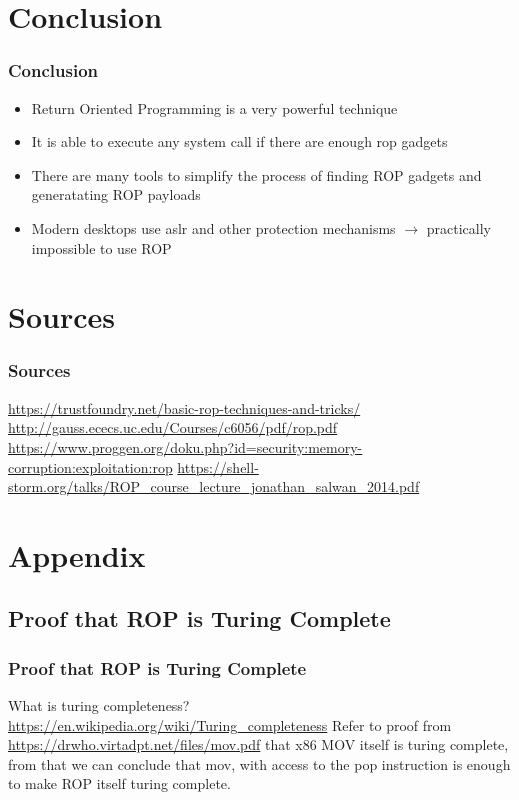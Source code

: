 \documentclass[11pt]{beamer}
\begin{document}
\section{Conclusion}
\begin{frame}
    \frametitle{Conclusion}
    \begin{itemize}
        \item Return Oriented Programming is a very powerful technique
        \item It is able to execute any system call if there are enough rop gadgets
        \item There are many tools to simplify the process of finding ROP gadgets and generatating ROP payloads
        \item Modern desktops use aslr and other protection mechanisms $\rightarrow$ practically impossible to use ROP
    \end{itemize}
\end{frame}

\section*{Sources}
\begin{frame}
    \frametitle{Sources}
    \url{https://trustfoundry.net/basic-rop-techniques-and-tricks/}
    \url{http://gauss.ececs.uc.edu/Courses/c6056/pdf/rop.pdf}
    \url{https://www.proggen.org/doku.php?id=security:memory-corruption:exploitation:rop}
    \url{https://shell-storm.org/talks/ROP_course_lecture_jonathan_salwan_2014.pdf}
\end{frame}

\section*{Appendix}
\subsection*{Proof that ROP is Turing Complete}
\begin{frame}
    \frametitle{Proof that ROP is Turing Complete}
    What is turing completeness? \url{https://en.wikipedia.org/wiki/Turing_completeness}
    Refer to proof from \url{https://drwho.virtadpt.net/files/mov.pdf} that x86 MOV itself is turing complete, from that we can conclude that mov, with access to the pop instruction is enough to make ROP itself turing complete.
\end{frame}
\end{document}
